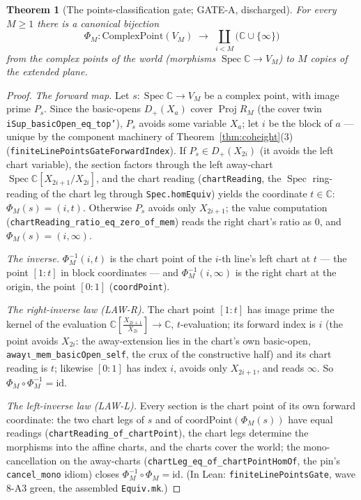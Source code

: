 \documentclass[11pt,a4paper]{article}
\theoremstyle{plain}
\newtheorem{theorem}{Theorem}[section]
\theoremstyle{definition}
\newcommand{\C}{\mathbb{C}}
\newcommand{\Spec}{\operatorname{Spec}}
\newcommand{\Proj}{\operatorname{Proj}}
\begin{document}
\begin{theorem}[The points-classification gate; GATE-A, discharged]
\label{thm:gate}
For every $M \ge 1$ there is a canonical bijection
\[
\Phi_M : \mathrm{ComplexPoint}(V_M) \;\longrightarrow\; \coprod_{i<M}
\bigl( \C \cup \{\infty\} \bigr)
\]
from the complex points of the world (morphisms $\Spec \C \to V_M$) to
$M$ copies of the extended plane.
\end{theorem}

\begin{proof}
\emph{The forward map.}  Let $s : \Spec\C \to V_M$ be a complex
point, with image prime $P_s$.  Since the basic-opens
$D_+(X_a)$ cover $\Proj R_M$ (the cover twin
\texttt{iSup\_basicOpen\_eq\_top'}), $P_s$ avoids some variable
$X_a$; let $i$ be the block of $a$ --- unique by the component
machinery of Theorem~\ref{thm:coheight}(3)
(\texttt{finiteLinePointsGateForwardIndex}).  If $P_s \in
D_+(X_{2i})$ (it avoids the left chart variable), the section factors
through the left away-chart $\Spec \C[X_{2i+1}/X_{2i}]$, and the chart
reading (\texttt{chartReading}, the $\Spec$ ring-reading of the chart
leg through \texttt{Spec.homEquiv}) yields the coordinate $t \in \C$:
$\Phi_M(s) = (i, t)$.  Otherwise $P_s$ avoids only $X_{2i+1}$; the
value computation (\texttt{chartReading\_ratio\_eq\_zero\_of\_mem})
reads the right chart's ratio as $0$, and $\Phi_M(s) = (i, \infty)$.

\emph{The inverse.}  $\Phi_M^{-1}(i, t)$ is the chart point of the
$i$-th line's left chart at $t$ --- the point $[1:t]$ in block
coordinates --- and $\Phi_M^{-1}(i,\infty)$ is the right chart at the
origin, the point $[0:1]$ (\texttt{coordPoint}).

\emph{The right-inverse law (LAW-R).}  The chart point
$[1:t]$ has image prime the kernel of the evaluation $\C[\frac{X_{2i+1}}{X_{2i}}]
\to \C$, $t$-evaluation; its forward index is $i$ (the point avoids
$X_{2i}$: the away-extension lies in the chart's own basic-open,
\texttt{awayι\_mem\_basicOpen\_self}, the crux of the constructive
half) and its chart reading is $t$; likewise $[0:1]$ has index $i$,
avoids only $X_{2i+1}$, and reads $\infty$.  So
$\Phi_M \circ \Phi_M^{-1} = \mathrm{id}$.

\emph{The left-inverse law (LAW-L).}  Every section is the chart
point of its own forward coordinate: the two chart legs of $s$ and of
$\mathrm{coordPoint}(\Phi_M(s))$ have equal readings
(\texttt{chartReading\_of\_chartPoint}), the chart legs determine the
morphisms into the affine charts, and the charts cover the world; the
mono-cancellation on the away-charts
(\texttt{chartLeg\_eq\_of\_chartPointHomOf}, the pin's
\texttt{cancel\_mono} idiom) closes $\Phi_M^{-1} \circ \Phi_M =
\mathrm{id}$.  (In Lean: \texttt{finiteLinePointsGate}, wave 8-A3
green, the assembled \texttt{Equiv.mk}.)
\end{proof}
\end{document}
